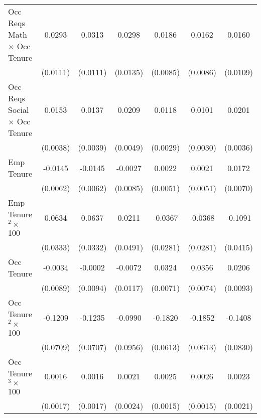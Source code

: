 {\begin{longtable}{l*{6}{c}}
Occ Reqs Math $\times$ Occ Tenure&      0.0293\sym{***}&      0.0313\sym{***}&      0.0298\sym{**} &      0.0186\sym{**} &      0.0162\sym{*}  &      0.0160         \\
                    &    (0.0111)         &    (0.0111)         &    (0.0135)         &    (0.0085)         &    (0.0086)         &    (0.0109)         \\
Occ Reqs Social $\times$ Occ Tenure&      0.0153\sym{***}&      0.0137\sym{***}&      0.0209\sym{***}&      0.0118\sym{***}&      0.0101\sym{***}&      0.0201\sym{***}\\
                    &    (0.0038)         &    (0.0039)         &    (0.0049)         &    (0.0029)         &    (0.0030)         &    (0.0036)         \\
Emp Tenure          &     -0.0145\sym{**} &     -0.0145\sym{**} &     -0.0027         &      0.0022         &      0.0021         &      0.0172\sym{**} \\
                    &    (0.0062)         &    (0.0062)         &    (0.0085)         &    (0.0051)         &    (0.0051)         &    (0.0070)         \\
Emp Tenure$^2\times$ 100&      0.0634\sym{*}  &      0.0637\sym{*}  &      0.0211         &     -0.0367         &     -0.0368         &     -0.1091\sym{***}\\
                    &    (0.0333)         &    (0.0332)         &    (0.0491)         &    (0.0281)         &    (0.0281)         &    (0.0415)         \\
Occ Tenure          &     -0.0034         &     -0.0002         &     -0.0072         &      0.0324\sym{***}&      0.0356\sym{***}&      0.0206\sym{**} \\
                    &    (0.0089)         &    (0.0094)         &    (0.0117)         &    (0.0071)         &    (0.0074)         &    (0.0093)         \\
Occ Tenure$^2\times$ 100&     -0.1209\sym{*}  &     -0.1235\sym{*}  &     -0.0990         &     -0.1820\sym{***}&     -0.1852\sym{***}&     -0.1408\sym{*}  \\
                    &    (0.0709)         &    (0.0707)         &    (0.0956)         &    (0.0613)         &    (0.0613)         &    (0.0830)         \\
Occ Tenure$^3\times$ 100&      0.0016         &      0.0016         &      0.0021         &      0.0025\sym{*}  &      0.0026\sym{*}  &      0.0023         \\
                    &    (0.0017)         &    (0.0017)         &    (0.0024)         &    (0.0015)         &    (0.0015)         &    (0.0021)         \\

\end{longtable}}
